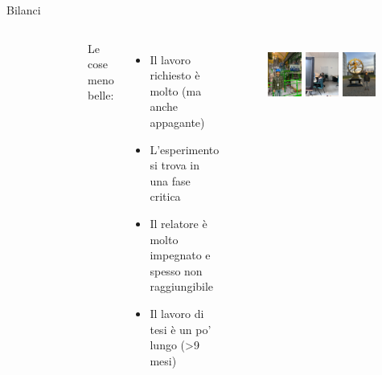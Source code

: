 \documentclass[
10pt,
aspectratio=169,
]{beamer}
\begin{document}
\begin{frame}{Bilanci}
\begin{columns}
\begin{figure}
    \end{figure}
    Le cose meno belle:
    \begin{itemize}
    \item Il lavoro richiesto è molto (ma anche appagante)
    \item L'esperimento si trova in una fase critica 
    \item Il relatore è molto impegnato e spesso non raggiungibile
    \item Il lavoro di tesi è un po' lungo (>9 mesi)
\end{itemize}
\begin{figure}
        \centering
        \includegraphics[width=0.3\textwidth]{figures/caverna.jpeg}
                \includegraphics[width=0.3\textwidth]{figures/ufficio.jpeg}
        \includegraphics[width=0.3\textwidth]{figures/shiva.jpeg}

    \end{figure}
\end{columns}
\end{frame}
\end{document}
